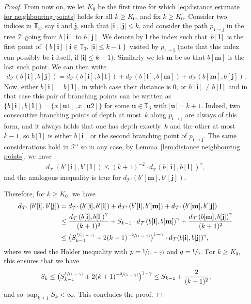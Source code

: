 \documentclass[JEP,XML,SOM,Unicode,NoFloatCountersInSection,published]{cedram}
\newcommand{\spfrac}[2]{\sfrac{#1}{(#2)}}
\newcommand{\enstq}[2]{\left\lbrace#1\mathrel{}\middle|\mathrel{}#2\right\rbrace}
\newcommand{\Tt}{\mathcal{T}}
\newcommand{\ii}{\mathbf{i}}
\newcommand{\jj}{\mathbf{j}}
\theoremstyle{plain}
\theoremstyle{definition}
\begin{document}
\begin{proof}
From now on, we let $K_0$ be the first time for which \eqref{eq:distance estimate for neighbouring points} holds for all $k \geq K_0$, and fix $k \geq K_0$.
Consider two indices in $\mathbb{T}_3$, say $\ii$ and $\jj$, such that $|\ii|,|\jj| \leq k$, and consider the path $p_{\ii \to \jj}$ in the tree $\Tt$ going from $b[\ii]$ to $b[\jj]$.
We denote by $\mathbf{l}$ the index such that~$b[\mathbf{l}]$ is the first point of $\enstq{b[\ii]}{ \ii\in \mathbb T_3, \ |\ii| \leq k-1}$ visited by $p_{\ii \to \jj}$ (note that this index can possibly be $\ii$ itself, if $|\ii| \leq k-1$).
Similarly we let $\mathbf{m}$ be so that $b[\mathbf{m}]$ is the last such point.
We can then write
\begin{align*}
d_{\Tt}(b[\ii],b[\jj]) = d_{\Tt}(b[\ii],b[\mathbf{l}])+d_{\Tt}(b[\mathbf{l}],b[\mathbf{m}])+d_{\Tt}(b[\mathbf{m}],b[\jj]).
\end{align*}
Now, either $b[\ii]=b[\mathbf{l}]$, in which case their distance is $0$, or $b[\ii]\neq b[\mathbf{l}]$ and in that case this pair of branching points can be written as $\{b[\ii], b[\mathbf{l}]\} =\{x[\mathbf{u}1],x[\mathbf{u}2]\}$ for some $\mathbf{u}\in \mathbb{T}_3$ with $|\mathbf{u}|=k+1$. Indeed, two consecutive branching points of depth at most~$k$ along $p_{\ii \to \jj}$ are always of this form, and it always holds that one has depth exactly~$k$ and the other at most $k-1$, so $b[\mathbf{l}]$ is either $b[\ii]$ or the second branching point of $p_{\ii \to \jj}$. The same considerations hold in $\Tt'$ so in any case, by Lemma~\ref{lem:distance neighbouring points}, we have
\begin{align*}
d_{\Tt'} \left( b'[\ii],b'[\mathbf{l}] \right) \leq (k+1)^{-2} \cdot d_{\Tt}( b[\ii],b[\mathbf{l}])^\gamma,
\end{align*}
and the analogous inequality is true for $d_{\Tt'}(b'[\mathbf{m}],b'[\jj])$.

Therefore, for $k\geq K_0$, we have
\begin{align*}
d_{\Tt'} \left( b'[\ii],b'[\jj] \right)
&= d_{\Tt'} \left( b'[\ii],b'[\mathbf{l}] \right)+d_{\Tt'} \left( b'[\mathbf{l}],b'[\mathbf{m}] \right)+d_{\Tt'} \left( b'[\mathbf{m}],b'[\jj] \right) \\
&\leq \frac{d_{\Tt} \left( b[\ii],b[\mathbf{l}]\right)^\gamma}{(k+1)^2} + S_{k-1} \cdot d_{\Tt} \left( b[\mathbf{l}],b[\mathbf{m}]\right)^\gamma + \frac{d_{\Tt} \left( b[\mathbf{m}],b[\jj] \right)^\gamma}{(k+1)^2}\\
&\leq \bigl( S_{k-1}^{\spfrac{1}{1-\gamma}} +2(k+1)^{-\spfrac{2}{1-\gamma}} \bigr)^{1-\gamma} \cdot d_{\Tt}( b[\ii],b[\jj])^\gamma,
\end{align*}
where we used the Hölder inequality with $p=\spfrac{1}{1-\gamma}$ and $q=\sfrac{1}{\gamma}$.
For $k \geq K_0$, this ensures that we have
\begin{align*}
S_{k}\leq \bigl( S_{k-1}^{\spfrac{1}{1-\gamma}} +2(k+1)^{-\spfrac{2}{1-\gamma}}\bigr)^{1-\gamma} \leq S_{k-1}+\frac{2}{(k+1)^2},
\end{align*}
and so $\sup_{k\geq 1} S_k<\infty$. This concludes the proof.
\end{proof}

\backmatter


\end{document}
